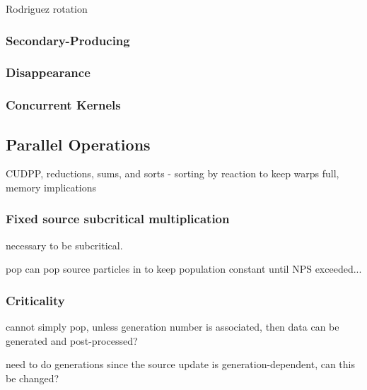 Rodriguez rotation

\subsubsection{Secondary-Producing}

\subsubsection{Disappearance}

\subsubsection{Concurrent Kernels}

\subsection{Parallel Operations}

CUDPP, reductions, sums, and sorts - sorting by reaction to keep warps full, memory implications

\subsubsection{Fixed source subcritical multiplication}

necessary to be subcritical.

pop can pop source particles in to keep population constant until NPS exceeded...

\subsubsection{Criticality}

cannot simply pop, unless generation number is associated, then data can be generated and post-processed?

need to do generations since the source update is generation-dependent, can this be changed?





